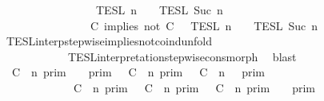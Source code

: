 \begin{isabellebody}
\ \ \ \ \ \ \ \ \ \ \ \ \ \ {\isasyminter}\ {\isacharparenleft}{\isasymlbrakk}{\isasymlbrakk}\ {\isasymPsi}\ {\isasymrbrakk}{\isasymrbrakk}\isactrlsub T\isactrlsub E\isactrlsub S\isactrlsub L\isactrlbsup {\isasymge}\ n\isactrlesup \ {\isasyminter}\ {\isasymlbrakk}{\isasymlbrakk}\ {\isasymPhi}\ {\isasymrbrakk}{\isasymrbrakk}\isactrlsub T\isactrlsub E\isactrlsub S\isactrlsub L\isactrlbsup {\isasymge}\ Suc\ n\isactrlesup {\isacharparenright}\isanewline
\ \ \ \ \ \ \ \ \ \ \ \ \ \ {\isacharequal}\ {\isasymlbrakk}{\isasymlbrakk}\ {\isacharparenleft}C\ implies\ not\ C\ {\isacharhash}\ {\isasymPsi}\ {\isasymrbrakk}{\isasymrbrakk}\isactrlsub T\isactrlsub E\isactrlsub S\isactrlsub L\isactrlbsup {\isasymge}\ n\isactrlesup \ {\isasyminter}\ {\isasymlbrakk}{\isasymlbrakk}\ {\isasymPhi}\ {\isasymrbrakk}{\isasymrbrakk}\isactrlsub T\isactrlsub E\isactrlsub S\isactrlsub L\isactrlbsup {\isasymge}\ Suc\ n\isactrlesup {\isacartoucheclose}\isanewline
\ \ \ \ \ \ \isamarkupfalse%
\ TESL{\isacharunderscore}interp{\isacharunderscore}stepwise{\isacharunderscore}implies{\isacharunderscore}not{\isacharunderscore}coind{\isacharunderscore}unfold\isanewline
\ \ \ \ \ \ \ \ \ \ \ \ TESL{\isacharunderscore}interpretation{\isacharunderscore}stepwise{\isacharunderscore}cons{\isacharunderscore}morph\ \isamarkupfalse%
\ blast\isanewline
\ \ \ \ \isamarkupfalse%
\ {\isacartoucheopen}{\isasymlbrakk}\ C\ {\isasymnot}{\isasymUp}\ n\ {\isasymrbrakk}\isactrlsub p\isactrlsub r\isactrlsub i\isactrlsub m\ {\isasyminter}\ {\isasymlbrakk}{\isasymlbrakk}\ {\isasymGamma}\ {\isasymrbrakk}{\isasymrbrakk}\isactrlsub p\isactrlsub r\isactrlsub i\isactrlsub m\ {\isasymunion}\ {\isasymlbrakk}\ C\ {\isasymUp}\ n\ {\isasymrbrakk}\isactrlsub p\isactrlsub r\isactrlsub i\isactrlsub m\ {\isasyminter}\ {\isasymlbrakk}{\isasymlbrakk}\ {\isacharparenleft}C\ {\isasymnot}{\isasymUp}\ n{\isacharparenright}\ {\isacharhash}\ {\isasymGamma}\ {\isasymrbrakk}{\isasymrbrakk}\isactrlsub p\isactrlsub r\isactrlsub i\isactrlsub m\isanewline
\ \ \ \ \ \ \ \ \ \ \ {\isacharequal}\ {\isacharparenleft}{\isasymlbrakk}\ C\ {\isasymnot}{\isasymUp}\ n\ {\isasymrbrakk}\isactrlsub p\isactrlsub r\isactrlsub i\isactrlsub m\ {\isasymunion}\ {\isasymlbrakk}\ C\ {\isasymUp}\ n\ {\isasymrbrakk}\isactrlsub p\isactrlsub r\isactrlsub i\isactrlsub m\ {\isasyminter}\ {\isasymlbrakk}\ C\ {\isasymnot}{\isasymUp}\ n\ {\isasymrbrakk}\isactrlsub p\isactrlsub r\isactrlsub i\isactrlsub m{\isacharparenright}\ {\isasyminter}\ {\isasymlbrakk}{\isasymlbrakk}\ {\isasymGamma}\ {\isasymrbrakk}{\isasymrbrakk}\isactrlsub p\isactrlsub r\isactrlsub i\isactrlsub m{\isacartoucheclose}\isanewline

\end{isabellebody}
